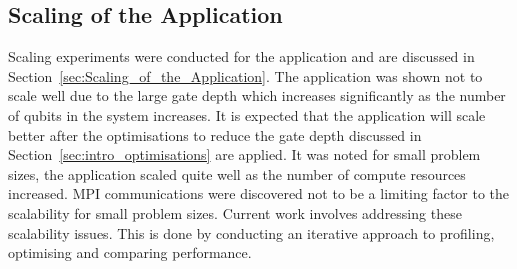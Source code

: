 \subsection{Scaling of the Application}
\label{sec:intro_scaling}
Scaling experiments were conducted for the application and are discussed in Section~\ref{sec:Scaling_of_the_Application}. The application was shown not to scale well due to the large gate depth which increases significantly as the number of qubits in the system increases. It is expected that the application will scale better after the optimisations to reduce the gate depth discussed in Section~\ref{sec:intro_optimisations} are applied. It was noted for small problem sizes, the application scaled quite well as the number of compute resources increased. MPI communications were discovered not to be a limiting factor to the scalability for small problem sizes. Current work involves addressing these scalability issues. This is done by conducting an iterative approach to profiling, optimising and comparing performance.
